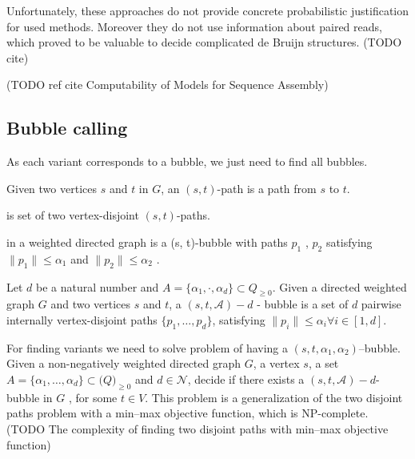 Unfortunately, these approaches do not provide concrete probabilistic justification for used methods. 
Moreover they do not use information about paired reads, which proved to be valuable to decide complicated de Bruijn structures. (TODO cite)
 
(TODO ref cite Computability of Models for Sequence Assembly)

\subsection{Bubble calling}
As each variant corresponds to a bubble, we just need to find all bubbles. 

\begin{definicia}[$(s, t)$ -path]
Given two vertices $s$ and $t$ in $G$, an $(s, t)$-path is a path from $s$ to $t$. 
\end{definicia}

\begin{definicia}[$(s, t)$ -bubble]
is set of two vertex-disjoint $(s,t)$-paths. 
\end{definicia}


\begin{definicia}
in a weighted directed graph is a (s, t)-bubble with paths $p_{1}$ , $p_{2}$ 
satisfying $\| p_{1} \| \leq \alpha_{1}$ and $\| p_{2} \| \leq \alpha_{2}$ .
\end{definicia}

\begin{definicia} 
Let $d$ be a natural number and $A = \{\alpha_1 ,\cdot , \alpha_d \} \subset Q_{\geq 0}$. 
Given a directed weighted graph $G$ and two vertices $s$ and $t$, 
a $(s, t, \mathcal{A})- d$ - bubble is a set of $d$ pairwise internally vertex-disjoint paths $\{p_1 , \ldots, p_d \}$, 
satisfying $\|p_i\| \leq \alpha_i \forall i \in [1, d]$.
\end{definicia}

For finding variants we need to solve problem of having a $(s, t, \alpha_1, \alpha_2)$--bubble.
Given a non-negatively weighted directed graph $G$, a vertex $s$,
a set $A = \{\alpha_1 ,\ldots , \alpha_d \} \subset \mathcal(Q)_{\geq 0}$ and $d \in \mathcal{N}$, decide if there exists a $(s, t, \mathcal{A})-d$-bubble in $G$ , for some $t \in V$.
This problem is a generalization of the two disjoint paths problem with a min--max objective function, which is NP-complete. 
(TODO The complexity of finding two disjoint paths with min--max objective function)

